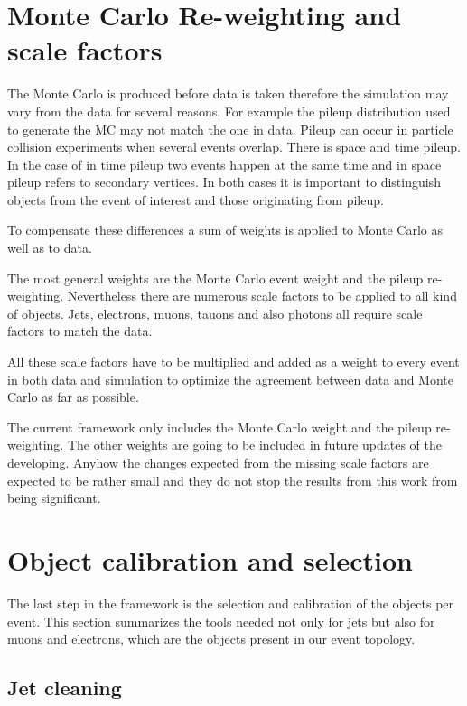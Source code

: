 \section{Monte Carlo Re-weighting and scale factors}

The Monte Carlo is produced before data is taken therefore the simulation may vary from the data for several reasons. For example the pileup distribution used to generate the MC may not match the one in data. Pileup can occur in particle collision experiments when several events overlap. There is space and time pileup. In the case of in time pileup two events happen at the same time and in space pileup refers to secondary vertices. In both cases it is important to distinguish objects from the event of interest and those originating from pileup.

To compensate these differences a sum of weights is applied to Monte Carlo as well as to data.

The most general weights are the Monte Carlo event weight and the pileup re-weighting. Nevertheless there are numerous scale factors to be applied to all kind of objects. Jets, electrons, muons, tauons and also photons all require scale factors to match the data. 

All these scale factors have to be multiplied and added as a weight to every event in both data and simulation to optimize the agreement between data and Monte Carlo as far as possible.

The current framework only includes the Monte Carlo weight and the pileup re-weighting. The other weights are going to be included in future updates of the developing. Anyhow the changes expected from the missing scale factors are expected to be rather small and they do not stop the results from this work from being significant.

\section{Object calibration and selection}

The last step in the framework is the selection and calibration of the objects per event. This section summarizes the tools needed not only for jets but also for muons and electrons, which are the objects present in our event topology.

\subsection{Jet cleaning}


